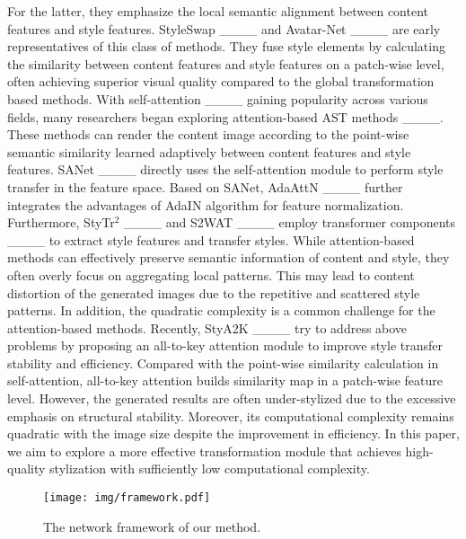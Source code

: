 For the latter, they emphasize the local semantic alignment between content features and style features. StyleSwap ____ and Avatar-Net ____ are early representatives of this class of methods. 
They fuse style elements by calculating the similarity between content features and style features on a patch-wise level, often achieving superior visual quality compared to the global transformation based methods. 
With self-attention ____ gaining popularity across various fields,  many researchers began exploring attention-based AST methods ____. 
These methods can render the content image according to the point-wise semantic similarity learned adaptively between content features and style features. 
SANet ____ directly uses the self-attention module to perform style transfer in the feature space. Based on SANet, AdaAttN ____ further integrates the advantages of AdaIN algorithm for feature normalization. Furthermore, StyTr$^2$ ____ and S2WAT ____ employ transformer components ____ to extract style features and transfer styles. 
While attention-based methods can effectively preserve semantic information of content and style, they often overly focus on aggregating local patterns. This may lead to content distortion of the generated images due to the repetitive and scattered style patterns.
In addition, the quadratic complexity is a common challenge for the attention-based methods. 
Recently, StyA2K ____ try to address above problems by proposing an all-to-key attention module to improve style transfer stability and efficiency. Compared with the point-wise similarity calculation in self-attention, all-to-key attention builds similarity map in a patch-wise feature level. 
However, the generated results are often under-stylized due to the excessive emphasis on structural stability. 
Moreover, its computational complexity remains quadratic with the image size despite the improvement in efficiency. 
In this paper, we aim to explore a more effective transformation module that achieves high-quality stylization with sufficiently low computational complexity.

\begin{figure} [t!]
\centering
\setlength{\abovecaptionskip}{-0.3cm}
\texttt{[image: img/framework.pdf]}
\caption{The network framework of our method.}
\label{framework}
\vspace{-0.4cm}
\end{figure}

